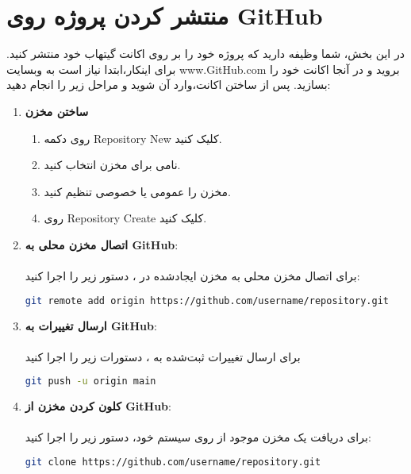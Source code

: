 \section*{منتشر کردن پروژه روی GitHub}
در این بخش، شما وظیفه دارید که پروژه خود را بر روی اکانت گیتهاب خود منتشر کنید. برای اینکار،ابتدا نیاز است به وبسایت www.GitHub.com بروید و در آنجا اکانت خود را بسازید. پس از ساختن اکانت،وارد آن شوید و مراحل زیر را انجام دهید:

\begin{enumerate}
    \item \textbf{ساختن مخزن}
    \begin{enumerate}
        \item {روی دکمه Repository New کلیک کنید.}
        \item {نامی برای مخزن انتخاب کنید.}
        \item {مخزن را عمومی یا خصوصی تنظیم کنید.}
        \item {روی Repository Create  کلیک کنید.}
    \end{enumerate}
    \item \textbf{اتصال مخزن محلی به GitHub}:\\\\
    برای اتصال مخزن  محلی به مخزن ایجادشده در ، دستور زیر را اجرا کنید:
    
    \begin{LTR}
    \begin{lstlisting}[language=bash]
    git remote add origin https://github.com/username/repository.git
    \end{lstlisting}
    \end{LTR}

    \item \textbf{ارسال تغییرات به GitHub}:\\\\
    برای ارسال تغییرات ثبت‌شده به ، دستورات زیر را اجرا کنید
    \begin{LTR}
    \begin{lstlisting}[language=bash]
    git push -u origin main
    \end{lstlisting}
    \end{LTR}  
    
    \item \textbf{کلون کردن مخزن از GitHub}:\\\\
    برای دریافت یک مخزن موجود از  روی سیستم خود، دستور زیر را اجرا کنید:
    \begin{LTR}
    \begin{lstlisting}[language=bash]
    git clone https://github.com/username/repository.git
    \end{lstlisting}
    \end{LTR} 


\end{enumerate}
